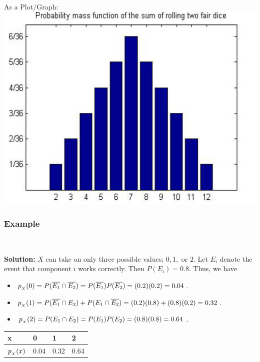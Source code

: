 \documentclass[compress]{beamer}
\begin{document}
\begin{frame}
As a Plot/Graph: \\
\includegraphics[scale=.35]{figs/TwoFairDice_pmf_Chart.png} 

\end{frame}





\begin{frame}\frametitle{Example}
\vspace{-.1in}
\\
\pause
\vspace{.6in}
{\tiny 
{\bf Solution: } $X$ can take on only three possible values; $0, 1,$ or $2$. Let $E_i$ denote the event that component $i$ works correctly. Then $P(E_i) = 0.8$. Thus, we have
\begin{itemize}
\item $p_{_X}(0)= P({\overline{E_1}} \cap {\overline{E_2}})= P({\overline{E_1}}) P( {\overline{E_2}})= (0.2)(0.2)= 0.04$.
\item $p_{_X}(1)= P({\overline{E_1}} \cap {E_2})+ P({E_1} \cap {\overline{E_2}})=(0.2)(0.8)+ (0.8)(0.2)=0 .32$.
\item  $p_{_X}(2)= P({E_1} \cap {E_2})= P({E_1}) P( {E_2})= (0.8)(0.8)= 0.64$.
\end{itemize}
\begin{center}
\begin{tabular}{|l|l|l|l|}
\hline\hline
x    & 0    & 1    & 2    \\ \hline
$p_{_X}(x)$ & 0.04 & 0.32 & 0.64 \\ \hline\hline
\end{tabular}
\end{center}
}
\end{frame}
\end{document}
